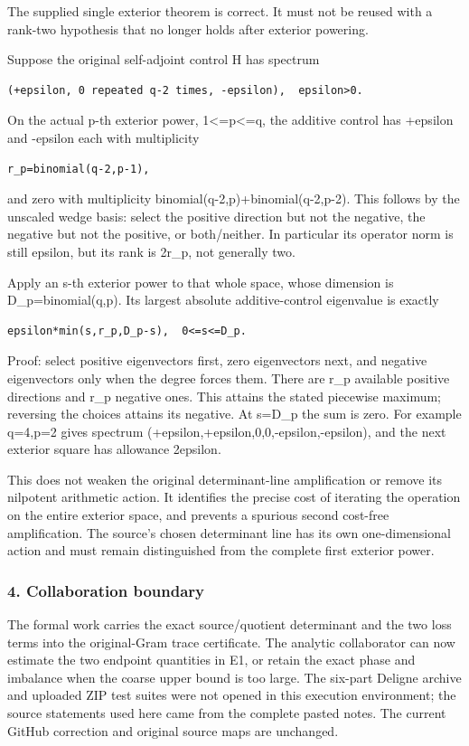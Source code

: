 The supplied single exterior theorem is correct. It must not be reused with a rank-two hypothesis that no longer holds after exterior powering.

Suppose the original self-adjoint control H has spectrum

\begin{verbatim}
(+epsilon, 0 repeated q-2 times, -epsilon),  epsilon>0.
\end{verbatim}

On the actual p-th exterior power, 1\textless=p\textless=q, the additive control has +epsilon and -epsilon each with multiplicity

\begin{verbatim}
r_p=binomial(q-2,p-1),
\end{verbatim}

and zero with multiplicity binomial(q-2,p)+binomial(q-2,p-2). This follows by the unscaled wedge basis: select the positive direction but not the negative, the negative but not the positive, or both/neither. In particular its operator norm is still epsilon, but its rank is 2r\_p, not generally two.

Apply an s-th exterior power to that whole space, whose dimension is D\_p=binomial(q,p). Its largest absolute additive-control eigenvalue is exactly

\begin{verbatim}
epsilon*min(s,r_p,D_p-s),  0<=s<=D_p.
\end{verbatim}

Proof: select positive eigenvectors first, zero eigenvectors next, and negative eigenvectors only when the degree forces them. There are r\_p available positive directions and r\_p negative ones. This attains the stated piecewise maximum; reversing the choices attains its negative. At s=D\_p the sum is zero. For example q=4,p=2 gives spectrum (+epsilon,+epsilon,0,0,-epsilon,-epsilon), and the next exterior square has allowance 2epsilon.

This does not weaken the original determinant-line amplification or remove its nilpotent arithmetic action. It identifies the precise cost of iterating the operation on the entire exterior space, and prevents a spurious second cost-free amplification. The source's chosen determinant line has its own one-dimensional action and must remain distinguished from the complete first exterior power.

\subsubsection{4. Collaboration boundary}\label{endpoint-pr23_original--collaboration-boundary}

The formal work carries the exact source/quotient determinant and the two loss terms into the original-Gram trace certificate. The analytic collaborator can now estimate the two endpoint quantities in E1, or retain the exact phase and imbalance when the coarse upper bound is too large. The six-part Deligne archive and uploaded ZIP test suites were not opened in this execution environment; the source statements used here came from the complete pasted notes. The current GitHub correction and original source maps are unchanged.
